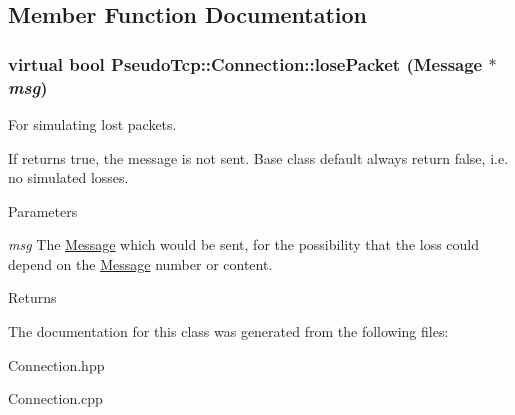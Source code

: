 \subsection{Member Function Documentation}
\hypertarget{classPseudoTcp_1_1Connection_aaa3f50be412caa3c5970fd5ca3d930c0}{
\subsubsection[{losePacket}]{\setlength{\rightskip}{0pt plus 5cm}virtual bool PseudoTcp::Connection::losePacket ({\bf Message} $\ast$ {\em msg})}}
\label{classPseudoTcp_1_1Connection_aaa3f50be412caa3c5970fd5ca3d930c0}


For simulating lost packets. 

If returns true, the message is not sent. Base class default always return false, i.e. no simulated losses. 
\begin{DoxyParams}{Parameters}
\item[{\em msg}]The \hyperlink{classPseudoTcp_1_1Message}{Message} which would be sent, for the possibility that the loss could depend on the \hyperlink{classPseudoTcp_1_1Message}{Message} number or content. \end{DoxyParams}
\begin{DoxyReturn}{Returns}

\end{DoxyReturn}


The documentation for this class was generated from the following files:\begin{DoxyCompactItemize}
\item 
Connection.hpp\item 
Connection.cpp\end{DoxyCompactItemize}
